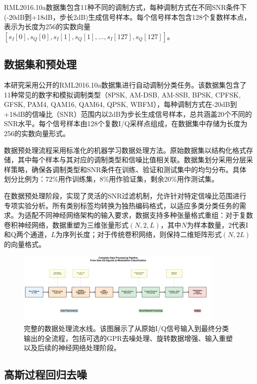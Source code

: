 \documentclass[conference]{IEEEtran}
\begin{document}
RML2016.10a数据集包含11种不同的调制方式，每种调制方式在不同SNR条件下(-20dB到+18dB，步长2dB)生成信号样本。每个信号样本包含128个复数样本点，表示为长度为256的实数向量$[s_I[0], s_Q[0], s_I[1], s_Q[1], ..., s_I[127], s_Q[127]]$。

\subsection{数据集和预处理}

本研究采用公开的RML2016.10a数据集进行自动调制分类任务。该数据集包含了11种常见的数字和模拟调制类型（8PSK, AM-DSB, AM-SSB, BPSK, CPFSK, GFSK, PAM4, QAM16, QAM64, QPSK, WBFM），每种调制方式在-20dB到+18dB的信噪比（SNR）范围内以2dB为步长生成信号样本，总共涵盖20个不同的SNR水平。每个信号样本由128个复数I/Q采样点组成，在数据集中存储为长度为256的实数向量形式。

数据预处理流程采用标准化的机器学习数据处理方法。原始数据集以结构化格式存储，其中每个样本与其对应的调制类型和信噪比值相关联。数据集划分采用分层采样策略，确保各调制类型和SNR条件在训练、验证和测试集中的均匀分布。具体划分比例为：72\%用作训练集，8\%用作验证集，剩余20\%用作测试集。

在数据预处理阶段，实现了灵活的SNR过滤机制，允许针对特定信噪比范围进行专项实验分析。所有类别标签均转换为独热编码格式，以适应多类分类任务的需求。为适配不同神经网络架构的输入要求，数据支持多种张量格式重组：对于复数卷积神经网络，数据重塑为三维张量形式$(N, 2, L)$，其中$N$为样本数量，2代表I和Q两个通道，$L$为序列长度；对于传统卷积网络，则保持二维矩阵形式$(N, 2L)$的向量格式。

\begin{figure}[htbp]
\centering
\includegraphics[width=0.9\textwidth]{figure/data_processing_pipeline.png}
\caption{完整的数据处理流水线。该图展示了从原始I/Q信号输入到最终分类输出的全流程，包括可选的GPR去噪处理、旋转数据增强、输入重塑以及后续的神经网络处理阶段。}
\label{fig:data_pipeline}
\end{figure}

\subsection{高斯过程回归去噪}
\end{document}

